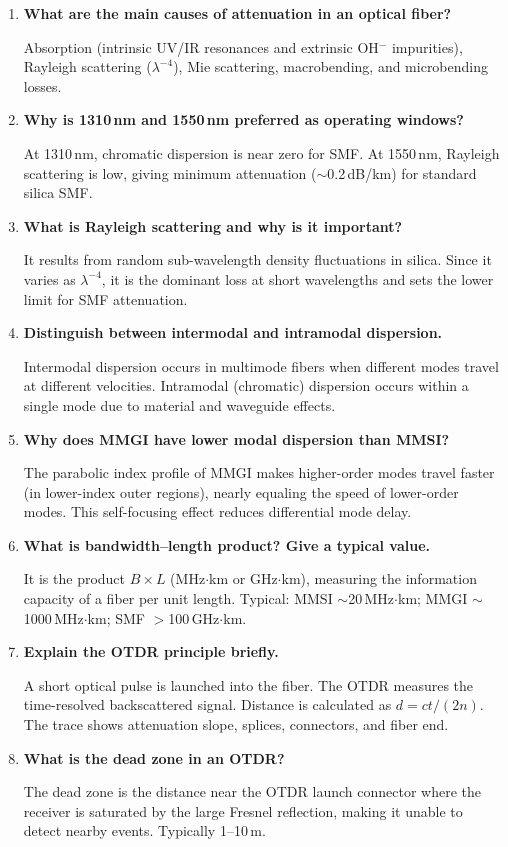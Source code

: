 \documentclass[12pt,a4paper]{article}
\newcommand{\Q}[1]{\textbf{#1}\par\noindent\ignorespaces}
\begin{document}
\begin{tcolorbox}[exambox, title={\textbf{Frequently Asked / Viva Questions}}]
\begin{enumerate}[topsep=0pt, label=\textbf{Q\arabic*.}, itemsep=5pt]
  \item \Q{What are the main causes of attenuation in an optical fiber?}
    Absorption (intrinsic UV/IR resonances and extrinsic OH$^-$ impurities), Rayleigh scattering ($\lambda^{-4}$), Mie scattering, macrobending, and microbending losses.
  \item \Q{Why is 1310\,nm and 1550\,nm preferred as operating windows?}
    At 1310\,nm, chromatic dispersion is near zero for SMF. At 1550\,nm, Rayleigh scattering is low, giving minimum attenuation ($\sim$0.2\,dB/km) for standard silica SMF.
  \item \Q{What is Rayleigh scattering and why is it important?}
    It results from random sub-wavelength density fluctuations in silica. Since it varies as $\lambda^{-4}$, it is the dominant loss at short wavelengths and sets the lower limit for SMF attenuation.
  \item \Q{Distinguish between intermodal and intramodal dispersion.}
    Intermodal dispersion occurs in multimode fibers when different modes travel at different velocities. Intramodal (chromatic) dispersion occurs within a single mode due to material and waveguide effects.
  \item \Q{Why does MMGI have lower modal dispersion than MMSI?}
    The parabolic index profile of MMGI makes higher-order modes travel faster (in lower-index outer regions), nearly equaling the speed of lower-order modes. This self-focusing effect reduces differential mode delay.
  \item \Q{What is bandwidth--length product? Give a typical value.}
    It is the product $B \times L$ (MHz$\cdot$km or GHz$\cdot$km), measuring the information capacity of a fiber per unit length. Typical: MMSI $\sim$20\,MHz$\cdot$km; MMGI $\sim$1000\,MHz$\cdot$km; SMF $>$100\,GHz$\cdot$km.
  \item \Q{Explain the OTDR principle briefly.}
    A short optical pulse is launched into the fiber. The OTDR measures the time-resolved backscattered signal. Distance is calculated as $d = ct/(2n)$. The trace shows attenuation slope, splices, connectors, and fiber end.
  \item \Q{What is the dead zone in an OTDR?}
    The dead zone is the distance near the OTDR launch connector where the receiver is saturated by the large Fresnel reflection, making it unable to detect nearby events. Typically 1--10\,m.

\end{enumerate}
\end{tcolorbox}
\end{document}
